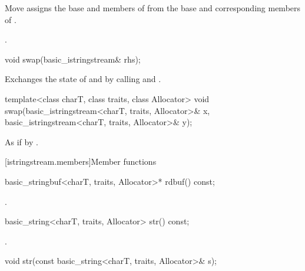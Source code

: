 \begin{itemdescr}
\pnum
\effects Move assigns the base and members of  from the base and corresponding
members of .

\pnum
\returns {}.
\end{itemdescr}

%
\begin{itemdecl}
void swap(basic_istringstream& rhs);
\end{itemdecl}

\begin{itemdescr}
\pnum
\effects Exchanges the state of  and
 by calling
 and
.
\end{itemdescr}


%
\begin{itemdecl}
template<class charT, class traits, class Allocator>
  void swap(basic_istringstream<charT, traits, Allocator>& x,
            basic_istringstream<charT, traits, Allocator>& y);
\end{itemdecl}

\begin{itemdescr}
\pnum
\effects As if by .
\end{itemdescr}

[istringstream.members]{Member functions}

%
\begin{itemdecl}
basic_stringbuf<charT, traits, Allocator>* rdbuf() const;
\end{itemdecl}

\begin{itemdescr}
\pnum
\returns
{}.
\end{itemdescr}

%
\begin{itemdecl}
basic_string<charT, traits, Allocator> str() const;
\end{itemdecl}

\begin{itemdescr}
\pnum
\returns
{}.
\end{itemdescr}

%
\begin{itemdecl}
void str(const basic_string<charT, traits, Allocator>& s);
\end{itemdecl}

